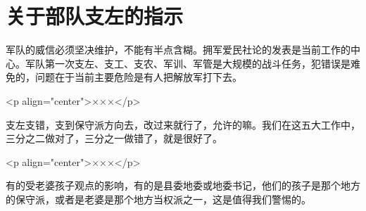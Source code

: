 \section[关于部队支左的指示（一九六七年四月）]{关于部队支左的指示}


军队的威信必须坚决维护，不能有半点含糊。拥军爱民社论的发表是当前工作的中心。军队第一次支左、支工、支农、军训、军管是大规模的战斗任务，犯错误是难免的，问题在于当前主要危险是有人把解放军打下去。

<p align="center">×××</p>

支左支错，支到保守派方向去，改过来就行了，允许的嘛。我们在这五大工作中，三分之二做对了，三分之一做错了，就是很好了。

<p align="center">×××</p>

有的受老婆孩子观点的影响，有的是县委地委或地委书记，他们的孩子是那个地方的保守派，或者是老婆是那个地方当权派之一，这是值得我们警惕的。


